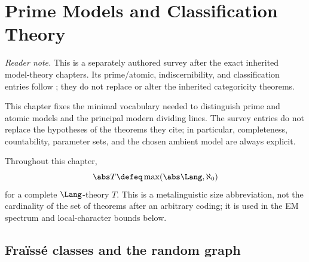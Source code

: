 \chapter{Prime Models and Classification Theory}
\label{sec:p03-classification-theory}

\noindent\textit{Reader note.}  This is a separately authored survey after the
exact inherited model-theory chapters.  Its prime/atomic, indiscernibility, and
classification entries follow \cite{Marker2002,Hodges1993}; they do not replace
or alter the inherited categoricity theorems.

This chapter fixes the minimal vocabulary needed to distinguish prime and
atomic models and the principal modern dividing lines.  The survey entries do
not replace the hypotheses of the theorems they cite; in particular,
completeness, countability, parameter sets, and the chosen ambient model are
always explicit.

Throughout this chapter,
\[
  \abs T\defeq\max(\abs\Lang,\aleph_0)
\]
for a complete \(\Lang\)-theory \(T\).  This is a metalinguistic size
abbreviation, not the cardinality of the set of theorems after an arbitrary
coding; it is used in the EM spectrum and local-character bounds below.

\section{Fra\"iss\'e classes and the random graph}
\label{sec:p03-fraisse}


